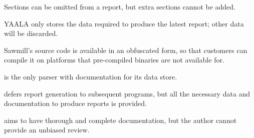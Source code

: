 \begin{table}[htb]
    \begin{eqlist}

        \item [\dag{}] Sections can be omitted from a report, but extra
            sections cannot be added.

        \item [\ddag{}] YAALA only stores the data required to produce the
            latest report; other data will be discarded.

        \item [\nialpha{}] Sawmill's source code is available in an
            obfuscated form, so that customers can compile it on platforms
            that pre-compiled binaries are not available for.

        \item [\nibeta{}] \parsername{} is the only parser with
            documentation for its data store.

        \item [\nichi{}] \parsername{} defers report generation to
            subsequent programs, but all the necessary data and
            documentation to produce reports is provided.

        \item [\niepsilon{}] \parsername{} aims to have thorough and
            complete documentation, but the author cannot provide an
            unbiased review.

    \end{eqlist}

\end{table}

\clearpage{}
